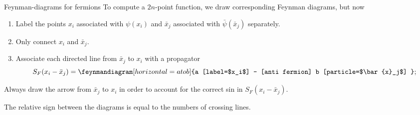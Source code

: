 \begin{mybox}{Feynman-diagrams for fermions} 
	To compute a $2n$-point function, we draw corresponding Feynman diagrams, but now
	\begin{enumerate}
		\item Label the points $x_i$ associated with $\psi(x_i)$ and $\bar{x}_j$ associated with $\bar{\psi}(\bar{x}_j)$ separately.
		\item Only connect $x_i$ and $\bar{x}_j$.
		\item Associate each directed line from $\bar{x}_j$ to $x_i$ with a propagator \begin{equation} 
		S_F(x_i-\bar{x}_j) = \feynmandiagram[horizontal=a to b]{a [label=$x_i$] -- [anti fermion] b [particle=$\bar{x}_j$] };
		\end{equation}
	\end{enumerate}
Always draw the arrow from $\bar{x}_j$ to $x_i$ in order to account for the correct sin in $S_F(x_i - \bar{x}_j)$.\\
\begin{statements}
The relative sign between the diagrams is equal to the numbers of crossing lines.
\end{statements}
\end{mybox}


